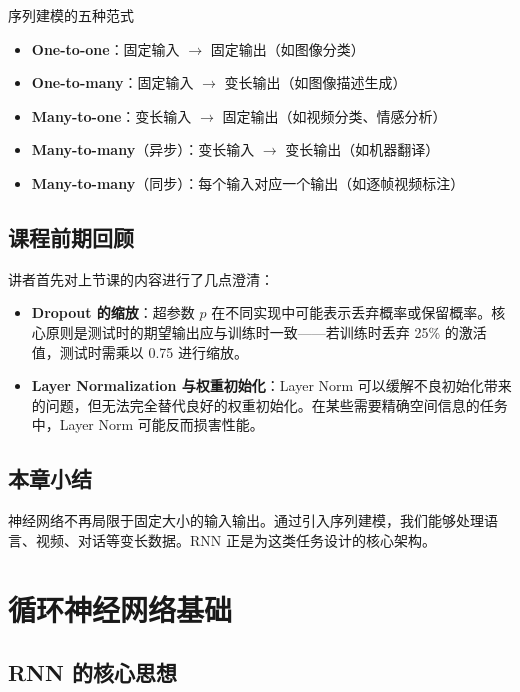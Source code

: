 \documentclass[a4paper]{article}
\begin{document}
\begin{importantbox}{序列建模的五种范式}
\begin{itemize}
    \item \textbf{One-to-one}：固定输入 $\rightarrow$ 固定输出（如图像分类）
    \item \textbf{One-to-many}：固定输入 $\rightarrow$ 变长输出（如图像描述生成）
    \item \textbf{Many-to-one}：变长输入 $\rightarrow$ 固定输出（如视频分类、情感分析）
    \item \textbf{Many-to-many}（异步）：变长输入 $\rightarrow$ 变长输出（如机器翻译）
    \item \textbf{Many-to-many}（同步）：每个输入对应一个输出（如逐帧视频标注）
\end{itemize}
\end{importantbox}

\subsection{课程前期回顾}

讲者首先对上节课的内容进行了几点澄清：

\begin{itemize}
    \item \textbf{Dropout 的缩放}：超参数 $p$ 在不同实现中可能表示丢弃概率或保留概率。核心原则是测试时的期望输出应与训练时一致——若训练时丢弃 25\% 的激活值，测试时需乘以 0.75 进行缩放。
    \item \textbf{Layer Normalization 与权重初始化}：Layer Norm 可以缓解不良初始化带来的问题，但无法完全替代良好的权重初始化。在某些需要精确空间信息的任务中，Layer Norm 可能反而损害性能。
\end{itemize}

\subsection{本章小结}

神经网络不再局限于固定大小的输入输出。通过引入序列建模，我们能够处理语言、视频、对话等变长数据。RNN 正是为这类任务设计的核心架构。


\section{循环神经网络基础}

\subsection{RNN 的核心思想}
\end{document}
